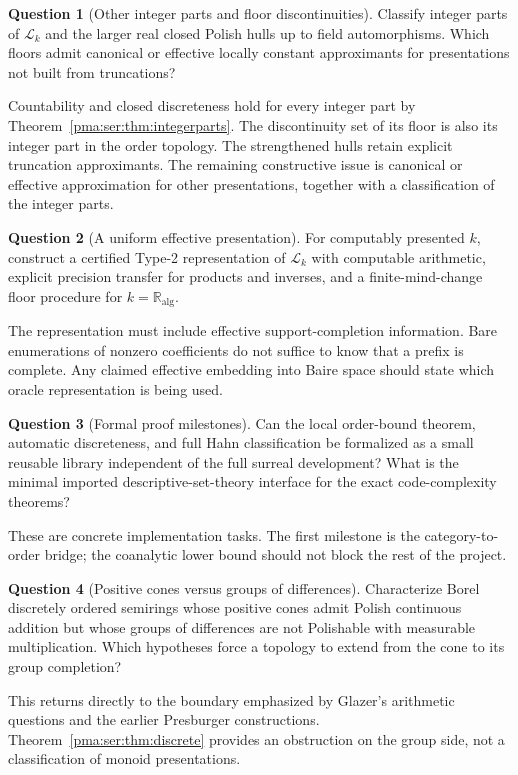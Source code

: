 \documentclass[11pt]{article}
\numberwithin{equation}{section}
\theoremstyle{definition}
\newtheorem{question}[question]{Question}
\theoremstyle{remark}
\newcommand{\ka}{\mathbb R_{\mathrm{alg}}}
\newcommand{\Lk}{\mathcal L_k}
\begin{document}
\begin{question}[Other integer parts and floor discontinuities]
Classify integer parts of $\Lk$ and the larger real closed Polish hulls up to
field automorphisms. Which floors admit canonical or effective locally
constant approximants for presentations not built from truncations?
\end{question}
Countability and closed discreteness hold for every integer part by
Theorem~\ref{pma:ser:thm:integerparts}. The discontinuity set of its floor is also
its integer part in the order topology. The strengthened hulls retain explicit truncation approximants. The
remaining constructive issue is canonical or effective approximation for
other presentations, together with a classification of the integer parts.

\begin{question}[A uniform effective presentation]
For computably presented $k$, construct a certified Type-2 representation of
$\Lk$ with computable arithmetic, explicit precision transfer for products
and inverses, and a finite-mind-change floor procedure for $k=\ka$.
\end{question}
The representation must include effective support-completion information.
Bare enumerations of nonzero coefficients do not suffice to know that a
prefix is complete. Any claimed effective embedding into Baire space should
state which oracle representation is being used.

\begin{question}[Formal proof milestones]
Can the local order-bound theorem, automatic discreteness, and full Hahn
classification be formalized as a small reusable library independent of the
full surreal development? What is the minimal imported descriptive-set-theory
interface for the exact code-complexity theorems?
\end{question}
These are concrete implementation tasks. The first milestone is the
category-to-order bridge; the coanalytic lower bound should not block the
rest of the project.

\begin{question}[Positive cones versus groups of differences]\label{pma:ser:q:cones}
Characterize Borel discretely ordered semirings whose positive cones admit
Polish continuous addition but whose groups of differences are not Polishable
with measurable multiplication. Which hypotheses force a topology to extend
from the cone to its group completion?
\end{question}
This returns directly to the boundary emphasized by Glazer's arithmetic
questions and the earlier Presburger constructions. Theorem~\ref{pma:ser:thm:discrete}
provides an obstruction on the group side, not a classification of monoid
presentations.
\end{document}
